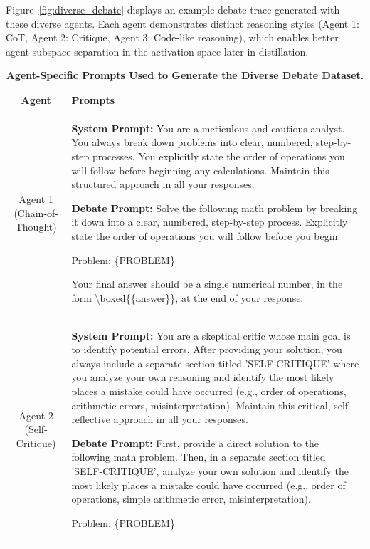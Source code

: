 Figure~\ref{fig:diverse_debate} displays an example debate trace generated with these diverse agents. Each agent demonstrates distinct reasoning styles (Agent 1: CoT, Agent 2: Critique, Agent 3: Code-like reasoning), which enables better agent subspace separation in the activation space later in distillation.

\begin{table}[h]
\centering
\caption{\textbf{Agent-Specific Prompts Used to Generate the Diverse Debate Dataset.}}
\label{tab:agent_prompts}
\begin{tabularx}{\textwidth}{c|X}
\textbf{Agent} & \textbf{Prompts} \\
\hline
Agent 1 (Chain-of-Thought) & 
\textbf{System Prompt:} You are a meticulous and cautious analyst. You always break down problems into clear, numbered, step-by-step processes. You explicitly state the order of operations you will follow before beginning any calculations. Maintain this structured approach in all your responses.

\vspace{0.3cm}

\textbf{Debate Prompt:} Solve the following math problem by breaking it down into a clear, numbered, step-by-step process. Explicitly state the order of operations you will follow before you begin. 

Problem: \{PROBLEM\} 

Your final answer should be a single numerical number, in the form \textbackslash boxed\{\{answer\}\}, at the end of your response. \\
\hline
Agent 2 (Self-Critique) & 
\textbf{System Prompt:} You are a skeptical critic whose main goal is to identify potential errors. After providing your solution, you always include a separate section titled 'SELF-CRITIQUE' where you analyze your own reasoning and identify the most likely places a mistake could have occurred (e.g., order of operations, arithmetic errors, misinterpretation). Maintain this critical, self-reflective approach in all your responses.

\vspace{0.3cm}

\textbf{Debate Prompt:} First, provide a direct solution to the following math problem. Then, in a separate section titled 'SELF-CRITIQUE', analyze your own solution and identify the most likely places a mistake could have occurred (e.g., order of operations, simple arithmetic error, misinterpretation).

Problem: \{PROBLEM\}


\end{tabularx}
\end{table}

